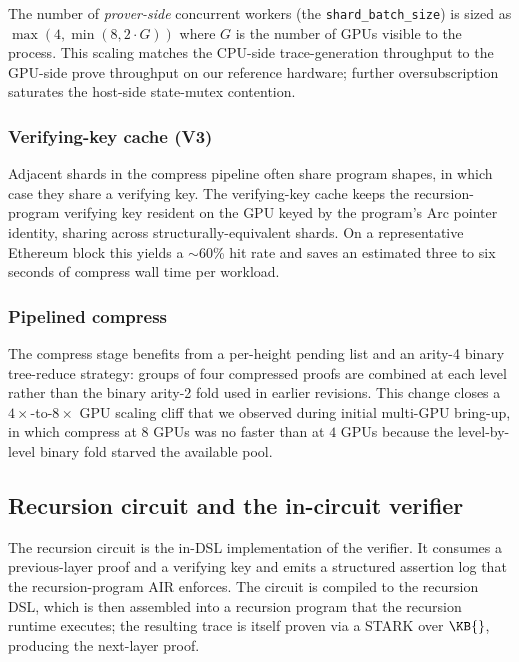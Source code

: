 The number of \emph{prover-side} concurrent workers (the \texttt{shard\_batch\_size}) is sized as $\max(4, \min(8, 2 \cdot G))$ where $G$ is the number of GPUs visible to the process. This scaling matches the CPU-side trace-generation throughput to the GPU-side prove throughput on our reference hardware; further oversubscription saturates the host-side state-mutex contention.

\subsubsection{Verifying-key cache (V3)}

Adjacent shards in the compress pipeline often share program shapes, in which case they share a verifying key. The verifying-key cache keeps the recursion-program verifying key resident on the GPU keyed by the program's Arc pointer identity, sharing across structurally-equivalent shards. On a representative Ethereum block this yields a $\sim$60\% hit rate and saves an estimated three to six seconds of compress wall time per workload.

\subsubsection{Pipelined compress}

The compress stage benefits from a per-height pending list and an arity-4 binary tree-reduce strategy: groups of four compressed proofs are combined at each level rather than the binary arity-2 fold used in earlier revisions. This change closes a $4\times$-to-$8\times$ GPU scaling cliff that we observed during initial multi-GPU bring-up, in which compress at $8$ GPUs was no faster than at $4$ GPUs because the level-by-level binary fold starved the available pool.

\subsection{Recursion circuit and the in-circuit verifier}
\label{sec:recursion}

The recursion circuit is the in-DSL implementation of the verifier. It consumes a previous-layer proof and a verifying key and emits a structured assertion log that the recursion-program AIR enforces. The circuit is compiled to the recursion DSL, which is then assembled into a recursion program that the recursion runtime executes; the resulting trace is itself proven via a STARK over $\KB{}$, producing the next-layer proof.

